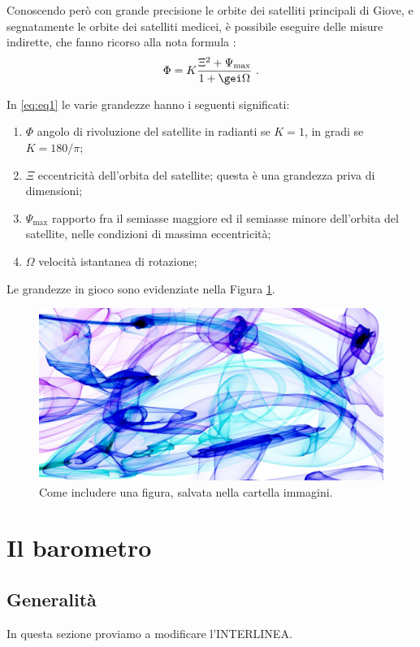 \documentclass[%
	corpo=11pt,
    twoside,
    stile=classica,
    oldstyle,
    tipotesi=custom,
    greek,
    evenboxes,
]{toptesi}
\begin{document}
{Conoscendo per\`o con grande precisione le orbite dei satelliti principali di Giove, e segnatamente le orbite dei satelliti medicei, \`e possibile eseguire delle misure indirette, che fanno ricorso alla nota formula \cite{gal}:
\begin{equation} \label{eq:eq1}
\Phi = K\frac{\Xi^2 +\Psi_\mathrm{max}}{1+\gei\Omega}\ .
\end{equation}

In \eqref{eq:eq1} le varie grandezze hanno i seguenti significati:
\begin{enumerate}
\item $\Phi$ angolo di rivoluzione del satellite in radianti se $K=1$, in gradi se $K=180/\pi$;
\item $\Xi$ eccentricit\`a dell'orbita del satellite; questa \`e una grandezza priva di dimensioni;
\item $\Psi_\mathrm{max}$ rapporto fra il semiasse maggiore ed il semiasse minore dell'orbita del satellite, nelle condizioni di massima eccentricit\`a;
\item $\Omega$ velocit\`a istantanea di rotazione; 
\end{enumerate}

Le grandezze in gioco sono evidenziate nella Figura \ref{fig:figura}.
\begin{figure}[htb]\centering
\includegraphics[scale=0.1]{Pictures/FlameArtwork2}
\caption{Come includere una figura, salvata nella cartella immagini.}\label{fig:figura}
\end{figure}




\chapter{Il barometro}
\section{Generalit\`a}
In questa sezione proviamo a modificare l'INTERLINEA.\\

}
\end{document}
